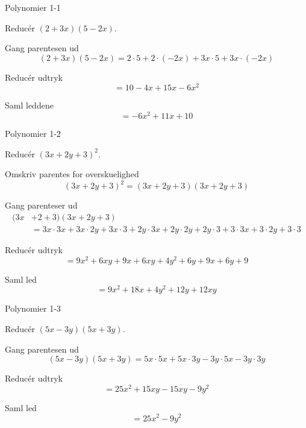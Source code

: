 \documentclass{article}
\begin{document}
\tableofcontents
\newpage

\begin{exercise}{Polynomier 1-1}

Reducér $(2+3x)(5-2x)$.


\hint

Gang parentesen ud
\[
(2+3x)(5-2x) = 2 \cdot 5 + 2 \cdot (-2x) + 3x \cdot 5 + 3x \cdot (-2x)
\]

\hint

Reducér udtryk
\[
= 10 -4x + 15x-6x^2
\]


\hint

Saml leddene 
\[
= -6x^2 +11x + 10
\]

\end{exercise}

\newpage

\begin{exercise}{Polynomier 1-2}
	
	Reducér $(3x+2y+3)^2$.
	
	
	\hint
	
	Omskriv parentes for overskuelighed
	\[
	(3x+2y+3)^2 = (3x+2y+3)(3x+2y+3)
	\]
	
	\hint
	
	Gang parenteser ud
	\begin{align*}
	(3x&+2+3)(3x+2y+3) \\
	&= 3x \cdot 3x + 3x \cdot 2y + 3x \cdot 3 + 2y \cdot 3x + 2y \cdot 2y + 2y \cdot 3 + 3 \cdot 3x + 3 \cdot 2y + 3 \cdot 3
	\end{align*}
	
	\hint
	
	Reducér udtryk
	\[
	= 9x^2+6xy+9x+6xy+4y^2+6y+9x+6y+9
	\]
	
	
	\hint
	
	Saml led
	\[
	= 9x^2+18x+4y^2+12y+12xy
	\]
	
\end{exercise}

\newpage

\begin{exercise}{Polynomier 1-3}
	
	Reducér $(5x-3y)(5x+3y)$.
	
	
	\hint
	
	Gang parentesen ud
	\[
	(5x-3y)(5x+3y) = 5x \cdot 5x + 5x \cdot 3y - 3y \cdot 5x - 3y \cdot 3y
	\]
	
	\hint
	
	Reducér udtryk
	\[
	= 25x^2 + 15xy - 15xy - 9y^2
	\]
	
	
	\hint
	
	Saml led
	\[
	= 25x^2-9y^2
	\]
	
\end{exercise}
\end{document}
